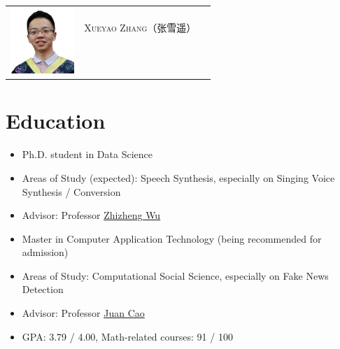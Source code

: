 \documentclass{resume}
\begin{document}

\Large{
  \begin{tabu}{ c l l }
    & \scshape{Xueyao Zhang（张雪遥）} &  \\
    &  &  \\
    &  &  \\
    & 
    &  
  \end{tabu}
}

\section{Education}
{
  \small 
\begin{itemize}
  \item Ph.D. student in Data Science
  \item Areas of Study (expected): Speech Synthesis, especially on Singing Voice Synthesis / Conversion
  \item Advisor: Professor \href{https://scholar.google.com/citations?user=K6zhweAAAAAJ&hl=en}{Zhizheng Wu} 
\end{itemize}
}

{
  \small 
\begin{itemize}
  \item Master in Computer Application Technology (being recommended for admission)
  \item Areas of Study: Computational Social Science, especially on Fake News Detection
  \item Advisor: Professor \href{https://scholar.google.com/citations?user=fSBdNg0AAAAJ&hl=zh-CN}{Juan Cao}
  \item GPA: 3.79 / 4.00, Math-related courses: 91 / 100
\end{itemize}
}
\end{document}
